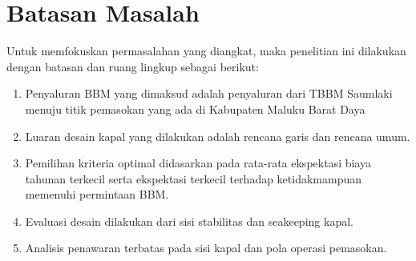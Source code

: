 \section{Batasan Masalah}
\label{sec:batasanmasalah}

Untuk memfokuskan permasalahan yang diangkat, maka penelitian ini dilakukan dengan batasan dan ruang lingkup sebagai berikut:
\begin{enumerate}
  \item Penyaluran BBM yang dimaksud adalah penyaluran dari TBBM Saumlaki menuju titik pemasokan yang ada di Kabupaten Maluku Barat Daya
  \item Luaran desain kapal yang dilakukan adalah rencana garis dan rencana umum.
  \item Pemilihan kriteria optimal didasarkan pada rata-rata ekspektasi biaya tahunan terkecil serta ekspektasi terkecil terhadap ketidakmampuan memenuhi permintaan BBM.
  \item Evaluasi desain dilakukan dari sisi stabilitas dan seakeeping kapal.
  \item Analisis penawaran terbatas pada sisi kapal dan pola operasi pemasokan.
\end{enumerate}
